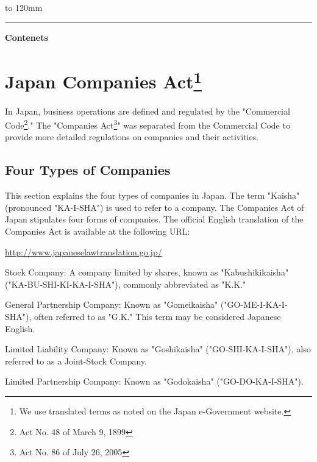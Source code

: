  \renewcommand{\headrulewidth}{11pt}%
 \hbox to 120mm{%
 \color{dominant} \leaders\hrule height11pt\hfil}


\vspace{18mm}
{\color{dominant} \LARGE \bfseries Contenets}
\vspace{-5mm}
\setcounter{tocdepth}{2}
\tableofcontents
\clearpage

\vspace{-20pt}


\section{Japan Companies Act\protect\footnote{We use translated terms as noted on the Japan e-Government website.}}

In Japan, business operations are defined and regulated by the "Commercial Code\footnote{Act No. 48 of March 9, 1899}." The "Companies Act\footnote{Act No. 86 of July 26, 2005}" was separated from the Commercial Code to provide more detailed regulations on companies and their activities.

\subsection{Four Types of Companies}
This section explains the four types of companies in Japan. The term "Kaisha" (pronounced "KA-I-SHA") is used to refer to a company. The Companies Act of Japan stipulates four forms of companies. The official English translation of the Companies Act is available at the following URL:

\href{http://www.japaneselawtranslation.go.jp/law/detail/?id=2455\&vm=04\&re=01\&new=1}{http://www.japaneselawtranslation.go.jp/}

\begin{coloritemize}
  \item Stock Company: A company limited by shares, known as "Kabushikikaisha" ("KA-BU-SHI-KI-KA-I-SHA"), commonly abbreviated as "K.K."
  \item General Partnership Company: Known as "Gomeikaisha" ("GO-ME-I-KA-I-SHA"), often referred to as "G.K." This term may be considered Japanese English.
  \item Limited Liability Company: Known as "Goshikaisha" ("GO-SHI-KA-I-SHA"), also referred to as a Joint-Stock Company.
  \item Limited Partnership Company: Known as "Godokaisha" ("GO-DO-KA-I-SHA").
\end{coloritemize}

